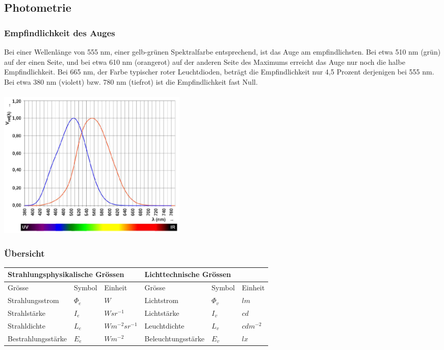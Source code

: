\begin{multicols}{2}
\subsection{Photometrie}
\subsubsection{Empfindlichkeit des Auges}
Bei einer Wellenlänge von 555 nm, einer gelb-grünen Spektralfarbe entsprechend, ist das Auge am empfindlichsten. Bei etwa 510 nm (grün) auf der einen Seite, und bei etwa 610 nm (orangerot) auf der anderen Seite des Maximums erreicht das Auge nur noch die halbe Empfindlichkeit. Bei 665 nm, der Farbe typischer roter Leuchtdioden, beträgt die Empfindlichkeit nur 4,5 Prozent derjenigen bei 555 nm. Bei etwa 380 nm (violett) bzw. 780 nm (tiefrot) ist die Empfindlichkeit fast Null. \\ \\

\includegraphics[width=0.4\textwidth]{images/empfindlichkeit_auge} 
\end{multicols}

\subsubsection{Übersicht}
\begin{tabular}{|l|l|l|l|l|l|}
    \hline
    \multicolumn{3}{|l|}{Strahlungsphysikalische Grössen} & \multicolumn{3}{l|}{Lichttechnische Grössen} \\ \hline
    Grösse             & Symbol   & Einheit          & Grösse             & Symbol & Einheit      \\ \hline
    Strahlungsstrom    & $\Phi_e$ & $W$              & Lichtstrom         & $\Phi_v$ & $lm$       \\ \hline
    Strahlstärke       & $I_e$    & $Wsr^{-1}$       & Lichtstärke        & $I_v$    & $cd$       \\ \hline
    Strahldichte       & $L_e$    & $Wm^{-2}sr^{-1}$ & Leuchtdichte       & $L_v$    & $cdm^{-2}$ \\ \hline
    Bestrahlungsstärke & $E_e$    & $Wm^{-2}$        & Beleuchtungsstärke & $E_v$    & $lx$       \\ \hline
\end{tabular}
